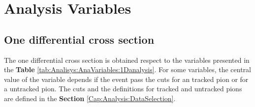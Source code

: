 \section{Analysis Variables}
\label{Cap:Analysis:Variables}

\subsection{One differential cross section}
\label{Cap:Analysis:Variables:1DAnalysis}

The one differential cross section is obtained respect to the variables presented in the \textbf{Table} \ref{tab:Analisys:AnaVariables:1Danalysis}. For some variables, the central value of the variable depends if the event pass the cuts for an tracked pion or for a untracked pion. The cuts and the definitions for tracked and untracked pions are defined in the \textbf{Section} \ref{Cap:Analysis:DataSelection}.

